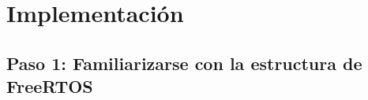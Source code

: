 \chapter{Implementación}
\label{chap:Implementación}


\section{Paso 1: Familiarizarse con la estructura de FreeRTOS}

